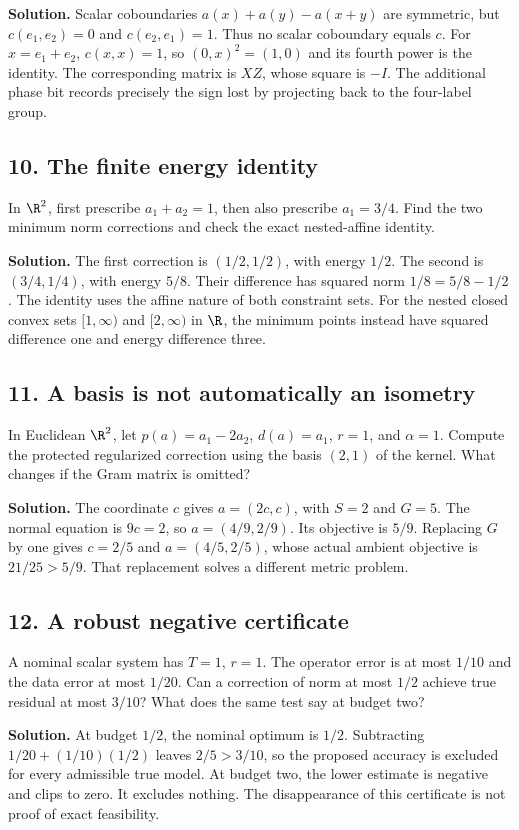 \textbf{Solution.} Scalar coboundaries $a(x)+a(y)-a(x+y)$ are symmetric, but $c(e_1,e_2)=0$ and $c(e_2,e_1)=1$. Thus no scalar coboundary equals $c$. For $x=e_1+e_2$, $c(x,x)=1$, so $(0,x)^2=(1,0)$ and its fourth power is the identity. The corresponding matrix is $XZ$, whose square is $-I$. The additional phase bit records precisely the sign lost by projecting back to the four-label group.

\subsection*{10. The finite energy identity}
In $\R^2$, first prescribe $a_1+a_2=1$, then also prescribe $a_1=3/4$. Find the two minimum norm corrections and check the exact nested-affine identity.

\textbf{Solution.} The first correction is $(1/2,1/2)$, with energy $1/2$. The second is $(3/4,1/4)$, with energy $5/8$. Their difference has squared norm $1/8=5/8-1/2$. The identity uses the affine nature of both constraint sets. For the nested closed convex sets $[1,\infty)$ and $[2,\infty)$ in $\R$, the minimum points instead have squared difference one and energy difference three.

\subsection*{11. A basis is not automatically an isometry}
In Euclidean $\R^2$, let $p(a)=a_1-2a_2$, $d(a)=a_1$, $r=1$, and $\alpha=1$. Compute the protected regularized correction using the basis $(2,1)$ of the kernel. What changes if the Gram matrix is omitted?

\textbf{Solution.} The coordinate $c$ gives $a=(2c,c)$, with $S=2$ and $G=5$. The normal equation is $9c=2$, so $a=(4/9,2/9)$. Its objective is $5/9$. Replacing $G$ by one gives $c=2/5$ and $a=(4/5,2/5)$, whose actual ambient objective is $21/25>5/9$. That replacement solves a different metric problem.

\subsection*{12. A robust negative certificate}
A nominal scalar system has $T=1$, $r=1$. The operator error is at most $1/10$ and the data error at most $1/20$. Can a correction of norm at most $1/2$ achieve true residual at most $3/10$? What does the same test say at budget two?

\textbf{Solution.} At budget $1/2$, the nominal optimum is $1/2$. Subtracting $1/20+(1/10)(1/2)$ leaves $2/5>3/10$, so the proposed accuracy is excluded for every admissible true model. At budget two, the lower estimate is negative and clips to zero. It excludes nothing. The disappearance of this certificate is not proof of exact feasibility.

